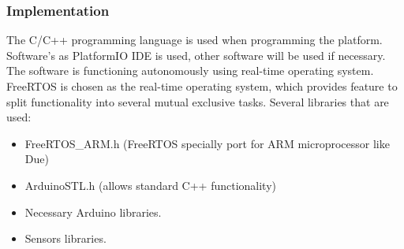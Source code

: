 \subsubsection{Implementation}\label{sec:4.8.3}
The C/C++ programming language is used when programming the platform. Software's as PlatformIO IDE is used, other software will be used if necessary. The software is functioning autonomously using real-time operating system. FreeRTOS is chosen as the real-time operating system, which provides feature to split functionality into several mutual exclusive tasks. Several libraries that are used:
\begin{itemize}
    \item FreeRTOS\_ARM.h (FreeRTOS specially port for ARM microprocessor like Due)
    \item ArduinoSTL.h (allows standard C++ functionality)
    \item Necessary Arduino libraries.
    \item Sensors libraries.
\end{itemize}


\raggedbottom